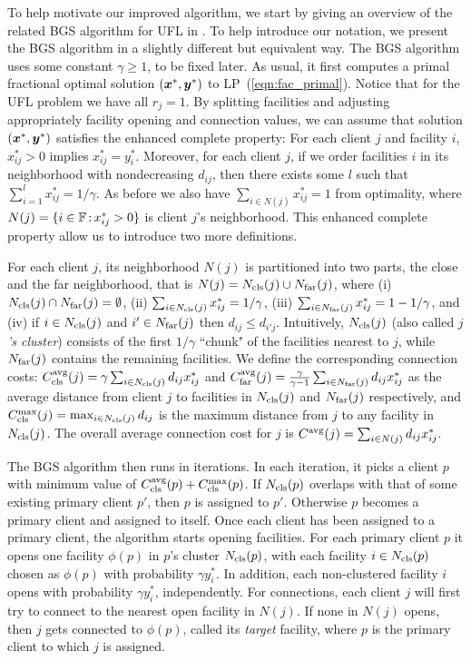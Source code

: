 \documentclass[11pt]{article}
\begin{document}
To help motivate our improved algorithm, we start by giving
an overview of the related BGS algorithm for UFL in
\cite{ByrkaGS10}. To help introduce our notation, we present
the BGS algorithm in a slightly different but equivalent
way. The BGS algorithm uses some constant $\gamma\ge 1$, to
be fixed later. As usual, it first computes a primal
fractional optimal solution $(\boldsymbol{x}^\ast,\boldsymbol{y}^\ast)$ to
LP~(\ref{eqn:fac_primal}). Notice that for the UFL problem
we have all $r_j=1$. By splitting facilities and adjusting
appropriately facility opening and connection values, we can
assume that solution $(\boldsymbol{x}^\ast, \boldsymbol{y}^\ast)$ satisfies the
enhanced complete property: For each client $j$ and facility
$i$, $x_{ij}^\ast>0$ implies
$x_{ij}^\ast=y_i^\ast$. Moreover, for each client $j$, if we
order facilities $i$ in its neighborhood with nondecreasing
$d_{ij}$, then there exists some $l$ such that $\sum_{i=1}^l
x_{ij}^\ast = 1/\gamma$. As before we also have $\sum_{i\in
  N(j)} x_{ij}^\ast = 1$ from optimality, where
$N(j)=\{i\in\mathbb{F} {\,:\,} x_{ij}^\ast > 0\}$ is client
$j$'s neighborhood. This enhanced complete property allow us
to introduce two more definitions.

For each client $j$, its neighborhood $N(j)$ is partitioned
into two parts, the close and the far neighborhood, that is
$N(j) = N_{\text{cls}}(j) \cup N_{\text{far}}(j)$, where (i) $N_{\text{cls}}(j) \cap
N_{\text{far}}(j) = \emptyset$, (ii) $\sum_{i\in N_{\text{cls}}(j)}
x_{ij}^\ast=1/\gamma$, (iii) $\sum_{i\in N_{\text{far}}(j)}
x_{ij}^\ast=1-1/\gamma$, and (iv) if $i\in N_{\text{cls}}(j)$ and
$i'\in N_{\text{far}}(j)$ then $d_{ij}\le d_{i'j}$.  Intuitively,
$N_{\text{cls}}(j)$ (also called \emph{$j$'s cluster}) consists of
the first $1/\gamma$ ``chunk" of the facilities nearest to
$j$, while $N_{\text{far}}(j)$ contains the remaining facilities.
We define the corresponding connection costs:
$C_{\text{cls}}^{{\mbox{\scriptsize\rm avg}}}(j)={\gamma}\sum_{i\in N_{\text{cls}}(j)}d_{ij}x_{ij}^\ast$
and
$C_{\text{far}}^{{\mbox{\scriptsize\rm avg}}}(j)=\frac{\gamma}{\gamma-1}\sum_{i\in N_{\text{far}}(j)}d_{ij}x_{ij}^\ast$
as the average distance from client $j$ to facilities in
$N_{\text{cls}}(j)$ and $N_{\text{far}}(j)$ respectively, and
$C_{\text{cls}}^{\max}(j)=\max_{i\in N_{\text{cls}}(j)}d_{ij}$ is the maximum
distance from $j$ to any facility in $N_{\text{cls}}(j)$. The
overall average connection cost for $j$ is
$C^{{\mbox{\scriptsize\rm avg}}}(j)=\sum_{i\in N(j)} d_{ij}x_{ij}^\ast$.

The BGS algorithm then runs in iterations. In each
iteration, it picks a client $p$ with minimum value of
$C_{\text{cls}}^{{\mbox{\scriptsize\rm avg}}}(p)+C_{\text{cls}}^{\max}(p)$. If $N_{\text{cls}}(p)$ overlaps with that
of some existing primary client $p'$, then $p$ is assigned
to $p'$. Otherwise $p$ becomes a primary client and assigned
to itself.  Once each client has been assigned to a primary
client, the algorithm starts opening facilities. For each
primary client $p$ it opens one facility $\phi(p)$ in $p$'s
cluster $N_{\text{cls}}(p)$, with each facility $i\in N_{\text{cls}}(p)$
chosen as $\phi(p)$ with probability $\gamma y_i^\ast$. In
addition, each non-clustered facility $i$ opens with
probability $\gamma y_i^\ast$, independently. For
connections, each client $j$ will first try to connect to
the nearest open facility in $N(j)$. If none in $N(j)$
opens, then $j$ gets connected to $\phi(p)$, called its
\emph{target} facility, where $p$ is the primary client to
which $j$ is assigned.
\end{document}
